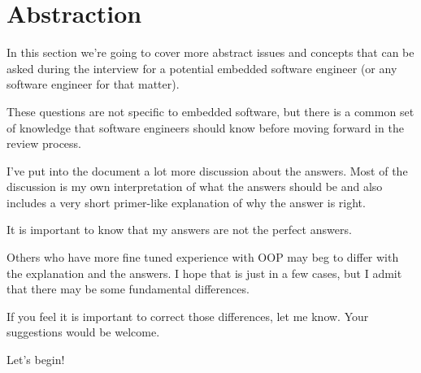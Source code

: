 \documentclass[12pt]{article}
\begin{document}
\section{Abstraction}

In this section we're going to cover more abstract issues and concepts
that can be asked during the interview for a potential embedded software
engineer (or any software engineer for that matter).

These questions are not specific to embedded software, but there is
a common set of knowledge that software engineers should know before
moving forward in the review process.

I've put into the document a lot more discussion about the answers.
Most of the discussion is my own interpretation of what the answers
should be and also includes a very short primer-like explanation of
why the answer is right.

It is important to know that my answers are not the perfect answers.
\par
Others who have more fine tuned experience with OOP may beg to differ
with the explanation and the answers.  I hope that is just in a few
cases, but I admit that there may be some fundamental differences.
\par
If you feel it is important to correct those differences, let me know.
Your suggestions would be welcome.
\par

Let's begin!
\end{document}
